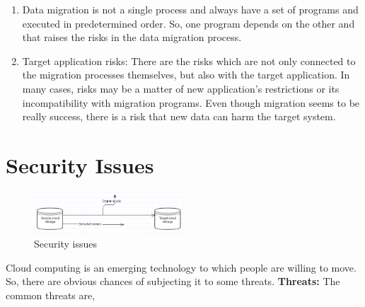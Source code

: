 \documentclass[11pt, pdftex, conference]{IEEEtran}
\begin{document}
\begin{enumerate}
\item Data migration is not a single process and always have a set of programs and executed in predetermined order. So, one program depends on the other and that raises the risks in the data migration process.
\item Target application risks: There are the risks which are not only connected to the migration processes themselves, but also with the target application. In many cases, risks may be a matter of new application's restrictions or its incompatibility with migration programs. Even though migration seems to be really success, there is a risk that new data can harm the target system.
\end{enumerate}

\section{\textbf{Security Issues}}
\begin{figure}
\includegraphics[width=0.5\textwidth]{cloud_issue}
\caption{Security issues}
\end{figure}
\hspace{10mm}Cloud computing is an emerging technology to which people are willing to move. So, there are obvious chances of subjecting it to some threats. 
\textbf{Threats:}
The common threats are\cite{13},
\end{document}
